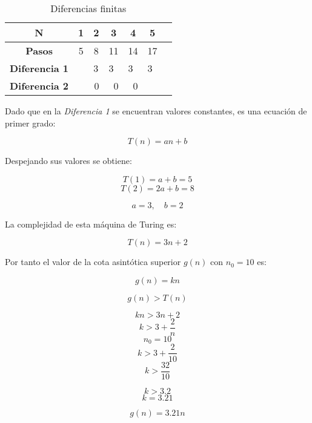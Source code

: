 \documentclass{uc3mpracticas}
\begin{document}
  \begin{table}[!h]
    \centering
  \begin{tabular}{|c|p{1cm}|p{1cm}|p{1cm}|p{1cm}|p{1cm}|p{1cm}|}
  \hline
  \textbf{N}     & \multicolumn{1}{c|}{\textbf{1}} & \multicolumn{1}{c|}{\textbf{2}} & \multicolumn{1}{c|}{\textbf{3}} & \multicolumn{1}{c|}{\textbf{4}} & \multicolumn{1}{c|}{\textbf{5}} \\ \hline
  \textbf{Pasos} & \multicolumn{1}{c|}{5}          & \multicolumn{1}{c|}{8}          & \multicolumn{1}{c|}{11}         & \multicolumn{1}{c|}{14}         & \multicolumn{1}{c|}{17} \\ \hline
  \textbf{Diferencia 1}                  &                                                         & 3                                                       & 3                               & 3                              & 3                             \\ \hline
  \textbf{Diferencia 2}                  &                                                         & \multicolumn{1}{r|}{0}                                  & \multicolumn{1}{r|}{0}          & \multicolumn{1}{r|}{0}       &                         \\ \hline
  \end{tabular}
  \caption{Diferencias finitas}
  \end{table}

  Dado que en la \textit{Diferencia 1} se encuentran valores constantes, es una ecuación de primer grado:


  $$ T(n) = an + b $$

  Despejando sus valores se obtiene:

  $$ T(1) = a + b = 5 $$
  $$ T(2) = 2a + b = 8 $$

  $$ a = 3 , \quad b = 2$$

  La complejidad de esta máquina de Turing es:

  $$ T(n) = 3n + 2$$

  Por tanto el valor de la cota asintótica superior $g(n)$ con $n_0 = 10$ es:

  $$ g(n) = kn $$

  $$ g(n) > T(n) $$

  $$ kn > 3n + 2 $$
  $$ k > 3 + \frac{2}{n} $$
  $$ n_0 = 10 $$
  $$ k > 3 + \frac{2}{10} $$
  $$ k > \frac{32}{10} $$

  $$ k > 3.2 $$
  $$ k = 3.21 $$

  $$ g(n) = 3.21n $$
\end{document}
